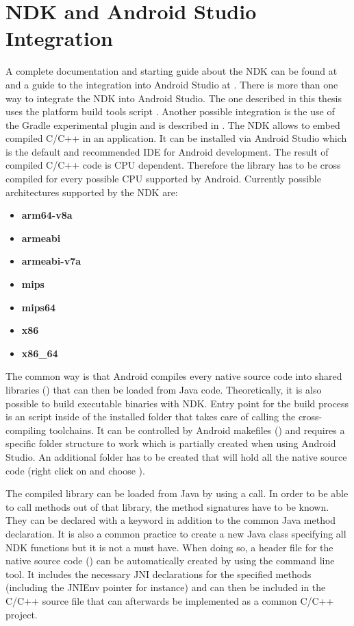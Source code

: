 \section{NDK and Android Studio Integration}\label{section:ndk_integration}
A complete documentation and starting guide about the NDK can be found at \parencite{ndk} and a guide to the integration into Android Studio at \parencite{ndk_integration}.
There is more than one way to integrate the NDK into Android Studio. The one described
in this thesis uses the platform build tools script . Another possible
integration is the use of the Gradle experimental plugin and is described in \parencite{gradle_experimental}.
The NDK allows to embed compiled C/C++ in an application. It can be installed via Android Studio which is the default and recommended IDE for Android development.
The result of compiled C/C++ code is CPU dependent. Therefore the library has to be cross compiled for
every possible CPU supported by Android. Currently possible architectures supported by the NDK are:
\begin{itemize}
\item \textbf{arm64-v8a}
\item \textbf{armeabi}
\item \textbf{armeabi-v7a}
\item \textbf{mips}
\item \textbf{mips64}
\item \textbf{x86}
\item \textbf{x86\_64}
\end{itemize}
The common way is that Android compiles every native source code into shared libraries
() that can then be loaded from Java code. Theoretically, it is also possible to build executable binaries with NDK. Entry point for the build process is an  script inside of the installed  folder that takes care of calling the cross-compiling toolchains. It can be controlled by Android makefiles () and requires a specific folder structure to work which is partially created when using Android Studio. An additional  folder has to be created that will hold all the native source code (right click on  and choose ).

The compiled library can be loaded from Java by using a
 call.
In order to be able to call methods out
of that library, the method signatures have to be known. They can be declared with a  keyword in addition to the common Java method declaration. It is also a
common practice to create a new Java class specifying all NDK functions but it is not a must have. When doing so, a header file for the native source code () can be automatically
created by using the  command line tool. It includes the necessary JNI
declarations for the specified methods (including the JNIEnv pointer for instance)
and can then be included in the C/C++ source file that can afterwards be implemented as a
common C/C++ project.

